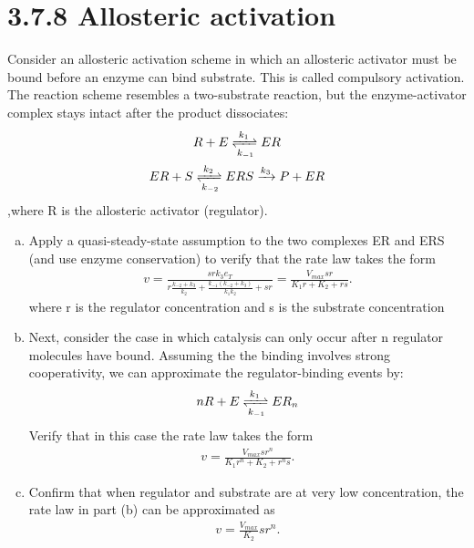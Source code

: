 \documentclass[paper=a4, fontsize=11pt]{scrartcl} %
\numberwithin{equation}{section} %
\numberwithin{figure}{section} %
\numberwithin{table}{section} %
\begin{document}
\section{3.7.8 Allosteric activation}
	Consider an allosteric activation scheme in which an allosteric activator must be bound before an enzyme can bind substrate. This is called compulsory activation. The reaction scheme resembles a two-substrate reaction, but the enzyme-activator complex stays intact after the product dissociates:
	\begin{gather*}
		R + E \xrightleftharpoons[k_{-1}]{k_1} ER\\
		ER + S \xrightleftharpoons[k_{-2}]{k_2} ERS \xrightarrow{k_3} P + ER
	\end{gather*}
	,where R is the allosteric activator (regulator).
	\begin{enumerate}[a)]
		\item  Apply a quasi-steady-state assumption to the two complexes ER and ERS (and use enzyme conservation) to verify that the rate law takes the form
		\begin{gather*}
			v=\frac{srk_3e_T}{r\frac{k_{-2}+k_3}{k_2}+\frac{k_{-1}(k_{-2}+k_3)}{k_1k_2}+sr}=\frac{V_{max}sr}{K_1r+K_2+rs}.
		\end{gather*}
		where r is the regulator concentration and s is the substrate concentration

		\item Next, consider the case in which catalysis can only occur after n regulator molecules have bound. Assuming the the binding involves strong cooperativity, we can approximate the regulator-binding events by:
		\begin{gather*}
			nR + E \xrightleftharpoons[k_{-1}]{k_1} ER_n
		\end{gather*}
		Verify that in this case the rate law takes the form
		\begin{gather*}
			v=\frac{V_{max}sr^n}{K_1r^n+K_2+r^ns}.
		\end{gather*}

		\item  Confirm that when regulator and substrate are at very low concentration, the rate law in part (b) can be approximated as
		\begin{gather*}
			v=\frac{V_{max}}{K_2}sr^n.
		\end{gather*}

	\end{enumerate}
\end{document}
